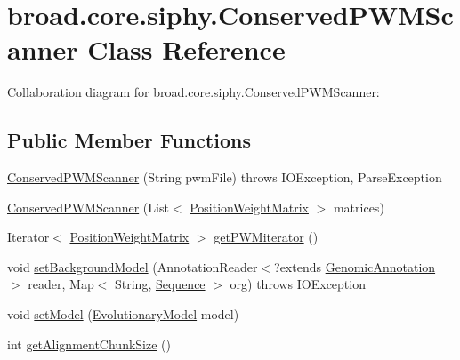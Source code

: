\hypertarget{classbroad_1_1core_1_1siphy_1_1_conserved_p_w_m_scanner}{\section{broad.\+core.\+siphy.\+Conserved\+P\+W\+M\+Scanner Class Reference}
\label{classbroad_1_1core_1_1siphy_1_1_conserved_p_w_m_scanner}
}


Collaboration diagram for broad.\+core.\+siphy.\+Conserved\+P\+W\+M\+Scanner\+:
\subsection*{Public Member Functions}
\begin{DoxyCompactItemize}
\item 
\hyperlink{classbroad_1_1core_1_1siphy_1_1_conserved_p_w_m_scanner_ae1f31084ecb4680cd3edf903ecd9b376}{Conserved\+P\+W\+M\+Scanner} (String pwm\+File)  throws I\+O\+Exception, Parse\+Exception 
\item 
\hyperlink{classbroad_1_1core_1_1siphy_1_1_conserved_p_w_m_scanner_a0701148d8534b8806f9f49e27a15433f}{Conserved\+P\+W\+M\+Scanner} (List$<$ \hyperlink{classbroad_1_1core_1_1motif_1_1_position_weight_matrix}{Position\+Weight\+Matrix} $>$ matrices)
\item 
Iterator$<$ \hyperlink{classbroad_1_1core_1_1motif_1_1_position_weight_matrix}{Position\+Weight\+Matrix} $>$ \hyperlink{classbroad_1_1core_1_1siphy_1_1_conserved_p_w_m_scanner_aa7018f23306757554a82bec2d677b763}{get\+P\+W\+Miterator} ()
\item 
void \hyperlink{classbroad_1_1core_1_1siphy_1_1_conserved_p_w_m_scanner_a465fbb69d4ab9d5422016b52abea75cb}{set\+Background\+Model} (Annotation\+Reader$<$?extends \hyperlink{interfacebroad_1_1core_1_1annotation_1_1_genomic_annotation}{Genomic\+Annotation} $>$ reader, Map$<$ String, \hyperlink{classbroad_1_1core_1_1sequence_1_1_sequence}{Sequence} $>$ org)  throws I\+O\+Exception 
\item 
void \hyperlink{classbroad_1_1core_1_1siphy_1_1_conserved_p_w_m_scanner_a089244695d241f1f6d0342f1598e995c}{set\+Model} (\hyperlink{classbroad_1_1core_1_1siphy_1_1_evolutionary_model}{Evolutionary\+Model} model)
\item 
int \hyperlink{classbroad_1_1core_1_1siphy_1_1_conserved_p_w_m_scanner_a8cd3bf3df6a1524920dd4da4a16fa5d7}{get\+Alignment\+Chunk\+Size} ()
\item 

\end{DoxyCompactItemize}
